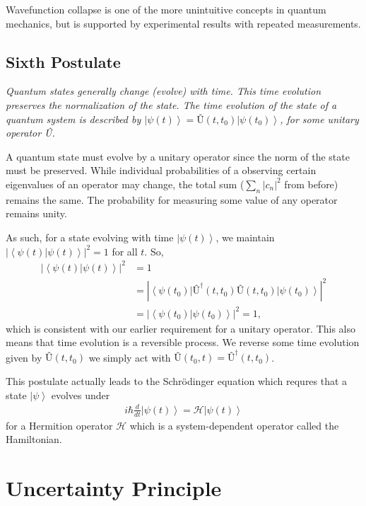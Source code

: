 \documentclass[11pt]{article} %
\newcommand{\bra}[1]{\left\langle #1 \right|}
\newcommand{\ket}[1]{\left|#1\right\rangle}
\newcommand{\braket}[2]{\left\langle#1 |  #2\right\rangle}
\begin{document}
Wavefunction collapse is one of the more unintuitive concepts in quantum mechanics, but is supported by experimental results with repeated measurements.

\subsection{Sixth Postulate}
\begin{center}
    \textit{Quantum states generally change (evolve) with time. This time evolution preserves the normalization of the state. The time evolution of the state of a quantum system is described by $\ket{\psi(t)} = \textbf{\^U}(t,t_0)\ket{\psi(t_0)}$, for some unitary operator \^U.}
\end{center}

A quantum state must evolve by a unitary operator since the norm of the state must be preserved. While individual probabilities of a observing certain eigenvalues of an operator may change, the total sum ($\sum_n\left|c_n\right|^2$ from before) remains the same. The probability for measuring some value of any operator remains unity.

As such, for a state evolving with time $\ket{\psi(t)}$, we maintain $\left|\braket{\psi(t)}{\psi(t)}\right|^2 = 1$ for all $t$. So,
\begin{align}
    \left|\braket{\psi(t)}{\psi(t)}\right|^2 &= 1\\
    &= \left|\bra{\psi(t_0)}\textbf{\^U}^\dagger(t,t_0)\textbf{\^U}(t,t_0)\ket{\psi(t_0)}\right|^2\nonumber\\
    &= \left|\braket{\psi(t_0)}{\psi(t_0)}\right|^2 = 1,
\end{align}
which is consistent with our earlier requirement for a unitary operator. This also means that time evolution is a reversible process. We reverse some time evolution given by $\textbf{\^U}(t,t_0)$ we simply act with $\textbf{\^U}(t_0,t) = \textbf{\^U}^\dagger(t,t_0)$.

This postulate actually leads to the Schr\"odinger equation which requres that a state $\ket{\psi}$ evolves under
\begin{align}
    i\hbar\frac{d}{dt}\ket{\psi(t)} = \mathcal{H}\ket{\psi(t)}
\end{align}
for a Hermition operator $\mathcal{H}$ which is a system-dependent operator called the Hamiltonian.

\section{Uncertainty Principle}
\end{document}
